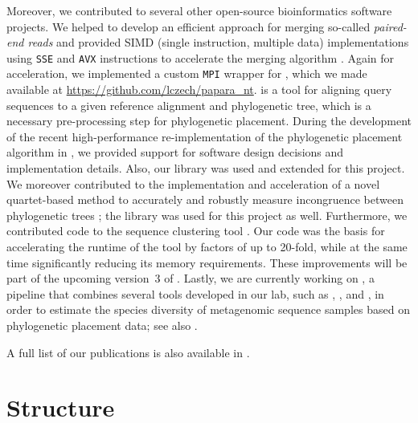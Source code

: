 Moreover, we contributed to several other open-source bioinformatics software projects.
We helped to develop an efficient approach for merging so-called \emph{paired-end reads}
and provided SIMD (single instruction, multiple data) implementations using \texttt{SSE} and \texttt{AVX} instructions
to accelerate the merging algorithm \cite{Flouri2017}.
Again for acceleration, we implemented a custom \texttt{\acs{MPI}} wrapper for  \cite{Berger2011a,Berger2012},
which we made available at \url{https://github.com/lczech/papara_nt}.
 is a tool for aligning query sequences to a given reference alignment and phylogenetic tree,
which is a necessary pre-processing step for phylogenetic placement.
During the development of the recent high-performance re-implementation of the phylogenetic placement algorithm
in  \cite{Barbera2018}, we provided support for software design decisions and implementation details.
Also, our  library was used and extended for this project.
We moreover contributed to the implementation and acceleration of a novel quartet-based method to accurately and robustly
measure incongruence between phylogenetic trees \cite{Zhou2017};
the  library was used for this project as well.
Furthermore, we contributed code to the sequence clustering tool  \cite{Mahe2014,Mahe2015}.
Our code was the basis for accelerating the runtime of the tool by factors of up to \num{20}-fold,
while at the same time significantly reducing its memory requirements.
These improvements will be part of the upcoming version~3 of .
Lastly, we are currently working on ,
a pipeline that combines several tools developed in our lab, such as
 \cite{Barbera2018},  \cite{Morel2019}, and  \cite{Kapli2017},
in order to estimate the species diversity of metagenomic sequence samples based on phylogenetic placement data;
see also .

A full list of our publications is also available in .



\section{Structure}
\label{ch:Introduction:sec:StructureOverview}

